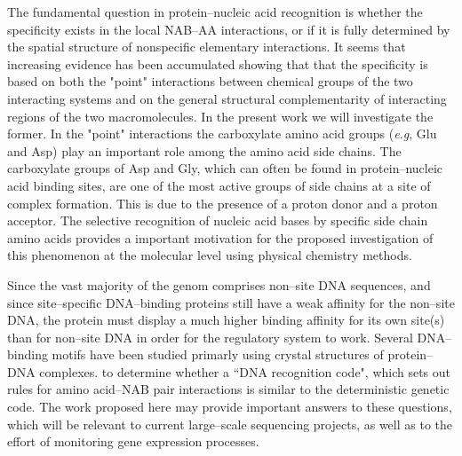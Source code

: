 The fundamental question in protein--nucleic acid recognition is 
whether the specificity exists in the local NAB--AA interactions,
or if it
is fully determined by the spatial structure of
nonspecific elementary interactions. It seems 
that increasing evidence has been accumulated showing that
that the specificity is based on both the  "point" interactions between
chemical groups of the two interacting
systems and on the general structural complementarity
of interacting regions of the two macromolecules.
In the present work we will investigate the former. 
In the "point" interactions the carboxylate amino acid groups 
({\it e.g}, Glu and Asp) play an important role among the 
amino acid side chains. 
The carboxylate groups of Asp and Gly, which can often be found in
protein--nucleic  acid binding sites, are one of the most active groups of
side chains at a site of complex formation. This is due to the presence of
a proton donor and a proton acceptor. The selective recognition of nucleic
acid bases by specific side chain amino acids provides a important
motivation
for the proposed investigation of this phenomenon at the molecular level
using physical chemistry methods.




Since the vast majority of the genom comprises non--site
DNA sequences, and  since site--specific DNA--binding 
proteins still have a weak affinity for the non--site DNA,
the protein must display a much higher binding affinity for its
own site(s) than for non--site DNA in order for the
regulatory system to work.\cite{s1}
Several DNA--binding motifs\cite{s1,s2,s3,s4,s5}
have been studied primarly using
crystal structures of protein--DNA complexes.
to determine whether a ``DNA recognition code", which
sets out rules for amino acid--NAB pair interactions is similar
to the deterministic genetic code. The work proposed
here may provide important answers to these questions, which
will be relevant to
current large--scale sequencing projects, as
well as to the effort of monitoring gene expression processes.

